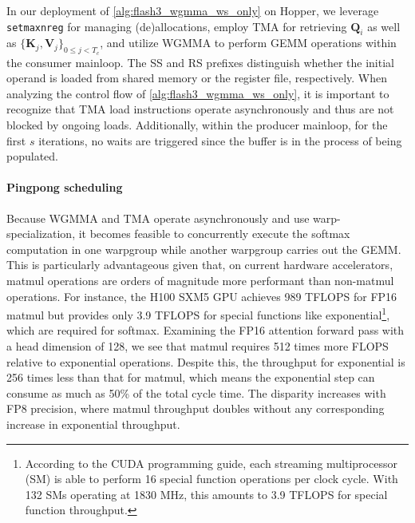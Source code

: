 \begin{enumerate}
In our deployment of \cref{alg:flash3_wgmma_ws_only} on Hopper, we leverage \verb|setmaxnreg| for managing (de)allocations, employ TMA for retrieving $\mathbf{Q}_i$ as well as $\{ \mathbf{K}_j, \mathbf{V}_j \}_{0 \leq j < T_c}$, and utilize WGMMA to perform GEMM operations within the consumer mainloop. The SS and RS prefixes distinguish whether the initial operand is loaded from shared memory or the register file, respectively. When analyzing the control flow of \cref{alg:flash3_wgmma_ws_only}, it is important to recognize that TMA load instructions operate asynchronously and thus are not blocked by ongoing loads. Additionally, within the producer mainloop, for the first $s$ iterations, no waits are triggered since the buffer is in the process of being populated.

\paragraph{Pingpong scheduling} Because WGMMA and TMA operate asynchronously and use warp-specialization, it becomes feasible to concurrently execute the softmax computation in one warpgroup while another warpgroup carries out the GEMM. This is particularly advantageous given that, on current hardware accelerators, matmul operations are orders of magnitude more performant than non-matmul operations. For instance, the H100 SXM5 GPU achieves 989 TFLOPS for FP16 matmul but provides only 3.9 TFLOPS for special functions like exponential\footnote{According to the CUDA programming guide, each streaming multiprocessor (SM) is able to perform 16 special function operations per clock cycle. With 132 SMs operating at 1830 MHz, this amounts to 3.9 TFLOPS for special function throughput.}, which are required for softmax. Examining the FP16 attention forward pass with a head dimension of 128, we see that matmul requires 512 times more FLOPS relative to exponential operations. Despite this, the throughput for exponential is 256 times less than that for matmul, which means the exponential step can consume as much as 50\% of the total cycle time. The disparity increases with FP8 precision, where matmul throughput doubles without any corresponding increase in exponential throughput.


\end{enumerate}
